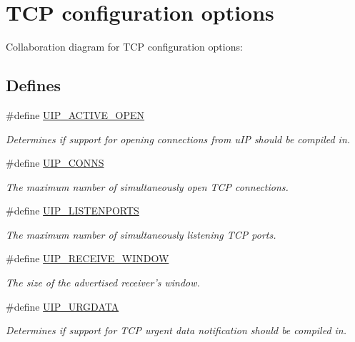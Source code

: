 \hypertarget{a00074}{
\section{TCP configuration options}
\label{a00074}
}


Collaboration diagram for TCP configuration options:

\subsection*{Defines}
\begin{CompactItemize}
\item 
\#define \hyperlink{a00074_gac0de06236b02659460445de30776e00}{UIP\_\-ACTIVE\_\-OPEN}
\begin{CompactList}\small\item\em Determines if support for opening connections from u\-IP should be compiled in. \item\end{CompactList}\item 
\#define \hyperlink{a00074_gf5fe83be78b78b9e7d9e7f1e34ab1cc5}{UIP\_\-CONNS}
\begin{CompactList}\small\item\em The maximum number of simultaneously open TCP connections. \item\end{CompactList}\item 
\#define \hyperlink{a00074_g8f4ebd8ef6c0ea665ed351d87fec09fd}{UIP\_\-LISTENPORTS}
\begin{CompactList}\small\item\em The maximum number of simultaneously listening TCP ports. \item\end{CompactList}\item 
\#define \hyperlink{a00074_g5b9dba2123705bce1ce95c3deca0bdad}{UIP\_\-RECEIVE\_\-WINDOW}
\begin{CompactList}\small\item\em The size of the advertised receiver's window. \item\end{CompactList}\item 
\#define \hyperlink{a00074_g51c1cd531ff0afb81620151f2248cd21}{UIP\_\-URGDATA}
\begin{CompactList}\small\item\em Determines if support for TCP urgent data notification should be compiled in. \item\end{CompactList}\item 

\end{CompactItemize}
